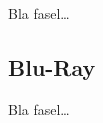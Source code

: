             Bla fasel\ldots
        
        \subsection{Blu-Ray}
        \label{ch:Technisch:sec:Optische Speicherung:sub:Blu-Ray}
        
            Bla fasel\ldots

